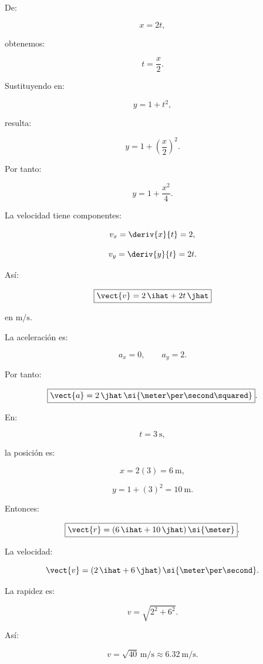 \begin{explicacion}
De:

\[
x=2t,
\]

obtenemos:

\[
t=\frac{x}{2}.
\]

Sustituyendo en:

\[
y=1+t^2,
\]

resulta:

\[
y
=
1+\left(\frac{x}{2}\right)^2.
\]

Por tanto:

\[
\boxed{
y=1+\frac{x^2}{4}
}.
\]

La velocidad tiene componentes:

\[
v_x=\deriv{x}{t}=2,
\]

\[
v_y=\deriv{y}{t}=2t.
\]

Así:

\[
\boxed{
\vect{v}
=
2\,\ihat+2t\,\jhat
}
\]

en \(\si{\meter\per\second}\).

La aceleración es:

\[
a_x=0,
\qquad
a_y=2.
\]

Por tanto:

\[
\boxed{
\vect{a}
=
2\,\jhat\,
\si{\meter\per\second\squared}
}.
\]

En:

\[
t=\SI{3}{\second},
\]

la posición es:

\[
x=2(3)=\SI{6}{\meter},
\]

\[
y=1+(3)^2=\SI{10}{\meter}.
\]

Entonces:

\[
\boxed{
\vect{r}
=
(6\,\ihat+10\,\jhat)\,\si{\meter}
}.
\]

La velocidad:

\[
\vect{v}
=
(2\,\ihat+6\,\jhat)
\,\si{\meter\per\second}.
\]

La rapidez es:

\[
v
=
\sqrt{2^2+6^2}.
\]

Así:

\[
\boxed{
v
=
\sqrt{40}\,\si{\meter\per\second}
\approx
\SI{6.32}{\meter\per\second}
}.
\]
\end{explicacion}


